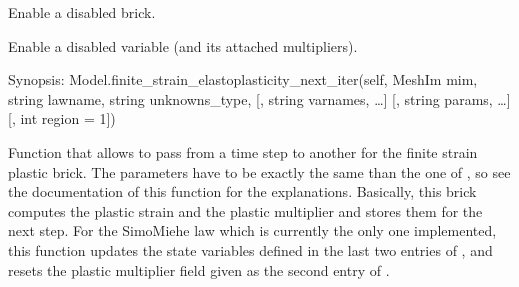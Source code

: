 \documentclass[a4paper,11pt,english]{sphinxmanual}
\begin{document}
\begin{fulllineitems}
\begin{fulllineitems}
\end{fulllineitems}


\begin{fulllineitems}
\label{\detokenize{python/cmdref_Model:getfem.Model.enable_bricks}}
Enable a disabled brick.

\end{fulllineitems}


\begin{fulllineitems}
\label{\detokenize{python/cmdref_Model:getfem.Model.enable_variable}}
Enable a disabled variable (and its attached multipliers).

\end{fulllineitems}


\begin{fulllineitems}
\label{\detokenize{python/cmdref_Model:getfem.Model.finite_strain_elastoplasticity_next_iter}}
Synopsis: Model.finite\_strain\_elastoplasticity\_next\_iter(self, MeshIm mim, string lawname, string unknowns\_type, {[}, string varnames, …{]} {[}, string params, …{]} {[}, int region = \sphinxhyphen{}1{]})

Function that allows to pass from a time step to another for the
finite strain plastic brick. The parameters have to be exactly the
same than the one of ,
so see the documentation of this function for the explanations.
Basically, this brick computes the plastic strain
and the plastic multiplier and stores them for the next step.
For the Simo\sphinxhyphen{}Miehe law which is currently the only one implemented,
this function updates the state variables defined in the last two
entries of , and resets the plastic multiplier field given
as the second entry of .


\end{fulllineitems}
\end{fulllineitems}
\end{document}
